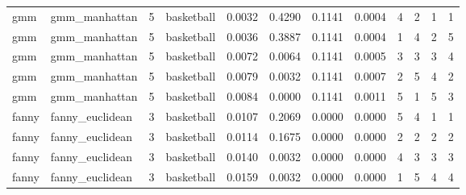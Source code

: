 \documentclass[
]{article}
\begin{document}
\begin{longtable}{| p{1.1cm} | p{2cm} | p{0.8cm} | p{1.3cm} | p{0.60cm} | p{0.7cm} | p{0.65cm} | p{0.65cm} | p{0.65cm} | p{0.65cm} | p{0.7cm} | p{0.65cm} |}
\cline{3-12}
\rowcolor{green} \scriptsize     gmm   & \scriptsize    gmm\_manhattan & \scriptsize    5    & \scriptsize basketball & \scriptsize    0.0032  &  \scriptsize 0.4290 & \scriptsize 0.1141 & \scriptsize    0.0004 & \scriptsize   4  & \scriptsize    2  & \scriptsize    1  & \scriptsize    1 \\
\scriptsize     gmm   & \scriptsize    gmm\_manhattan & \scriptsize    5    & \scriptsize basketball & \scriptsize    0.0036  &  \scriptsize 0.3887 & \scriptsize 0.1141 & \scriptsize    0.0004 & \scriptsize   1  & \scriptsize    4  & \scriptsize    2  & \scriptsize    5 \\
\scriptsize     gmm   & \scriptsize    gmm\_manhattan & \scriptsize    5    & \scriptsize basketball & \scriptsize    0.0072  &  \scriptsize 0.0064 & \scriptsize 0.1141 & \scriptsize    0.0005 & \scriptsize   3  & \scriptsize    3  & \scriptsize    3  & \scriptsize    4 \\
\scriptsize     gmm   & \scriptsize    gmm\_manhattan & \scriptsize    5    & \scriptsize basketball & \scriptsize    0.0079  &  \scriptsize 0.0032 & \scriptsize 0.1141 & \scriptsize    0.0007 & \scriptsize   2  & \scriptsize    5  & \scriptsize    4  & \scriptsize    2 \\
\scriptsize     gmm   & \scriptsize    gmm\_manhattan & \scriptsize    5    & \scriptsize basketball & \scriptsize    0.0084  &  \scriptsize 0.0000 & \scriptsize 0.1141 & \scriptsize    0.0011 & \scriptsize   5  & \scriptsize    1  & \scriptsize    5  & \scriptsize    3 \\
\cline{1-12}
\scriptsize   fanny   & \scriptsize  fanny\_euclidean & \scriptsize    3    & \scriptsize basketball & \scriptsize    0.0107  &  \scriptsize 0.2069 & \scriptsize 0.0000 & \scriptsize    0.0000 & \scriptsize   5  & \scriptsize    4  & \scriptsize    1  & \scriptsize    1 \\
\scriptsize   fanny   & \scriptsize  fanny\_euclidean & \scriptsize    3    & \scriptsize basketball & \scriptsize    0.0114  &  \scriptsize 0.1675 & \scriptsize 0.0000 & \scriptsize    0.0000 & \scriptsize   2  & \scriptsize    2  & \scriptsize    2  & \scriptsize    2 \\
\scriptsize   fanny   & \scriptsize  fanny\_euclidean & \scriptsize    3    & \scriptsize basketball & \scriptsize    0.0140  &  \scriptsize 0.0032 & \scriptsize 0.0000 & \scriptsize    0.0000 & \scriptsize   4  & \scriptsize    3  & \scriptsize    3  & \scriptsize    3 \\
\scriptsize   fanny   & \scriptsize  fanny\_euclidean & \scriptsize    3    & \scriptsize basketball & \scriptsize    0.0159  &  \scriptsize 0.0032 & \scriptsize 0.0000 & \scriptsize    0.0000 & \scriptsize   1  & \scriptsize    5  & \scriptsize    4  & \scriptsize    4 \\

\end{longtable}
\end{document}
